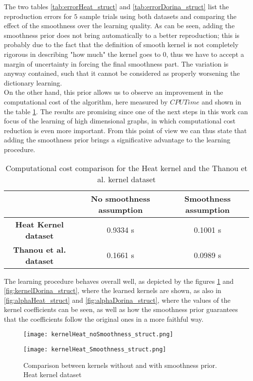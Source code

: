 The two tables \ref{tab:errorHeat_struct} and \ref{tab:errorDorina_struct} list the reproduction errors for $5$ sample trials using both datasets and comparing the effect of the smoothness over the learning quality. As can be seen, adding the smoothness prior does not bring automatically to a better reproduction; this is probably due to the fact that the definition of smooth kernel is not completely rigorous in describing "how much" the kernel goes to $0$, thus we have to accept a margin of uncertainty in forcing the final smoothness part. The variation is anyway contained, such that it cannot be considered as properly worsening the dictionary learning.\\

On the other hand, this prior allows us to observe an improvement in the computational cost of the algorithm, here measured by $CPUTime$ and shown in the table \ref{tab:CPUTime_struct}. The results are promising since one of the next steps in this work can focus of the learning of high dimensional graphs, in which computational cost reduction is even more important. From this point of view we can thus state that adding the smoothness prior brings a significative advantage to the learning procedure.

\begin{table}[htbp]
  \centering
  \begin{tabular}{c|c|c}
    &
    \multicolumn{1}{c}{\textbf{No smoothness assumption}} &
    \multicolumn{1}{|c}{\textbf{Smoothness assumption}}\\
    \hline
    \textbf{Heat Kernel dataset} & 0.9334 s & 0.1001 s\\
    \textbf{Thanou et al. dataset} & 0.1661 s & 0.0989 s\\
  \end{tabular}
  \caption{Computational cost comparison for the Heat kernel and the Thanou et al. kernel dataset}
  \label{tab:CPUTime_struct}
\end{table}

The learning procedure behaves overall well, as depicted by the figures \ref{fig:kernelHeat_struct} and \ref{fig:kernelDorina_struct}, where the learned kernels are shown, as also in \autoref{fig:alphaHeat_struct} and \autoref{fig:alphaDorina_struct}, where the values of the kernel coefficients can be seen, as well as how the smoothness prior guarantees that the coefficients follow the original ones in a more faithful way.

\begin{figure}
  \begin{minipage}[c]{.5\textwidth}
    \centering
    \texttt{[image: kernelHeat\_noSmoothness\_struct.png]}
  \end{minipage}
  \begin{minipage}[c]{.5\textwidth}
    \centering
    \texttt{[image: kernelHeat\_Smoothness\_struct.png]}
  \end{minipage}
  \caption{Comparison between kernels without and with smoothness prior. Heat kernel dataset}
  \label{fig:kernelHeat_struct}
\end{figure}

